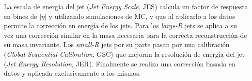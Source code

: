 La escala de energía del jet (\textit{Jet Energy Scale}, JES) \cite{JETM-2018-05} calcula un factor de respuesta en bines de $|\eta|$ y \pt utilizando simulaciones de MC, y que al aplicarlo a los datos permite la corrección en energía de los jets. Para los \textit{large-R} jets se aplica a su vez una corrección similar en la masa necesaria para la correcta reconstrucción de su masa invariante. Los \textit{small-R} jets por su parte pasan por una calibración (\textit{Global Sequential Calibration}, GSC) que mejoran la resolución de energía del jet (\textit{Jet Energy Resolution}, JER). Finalmente se realiza una corrección basada en datos y aplicada exclusivamente a los mismos.









